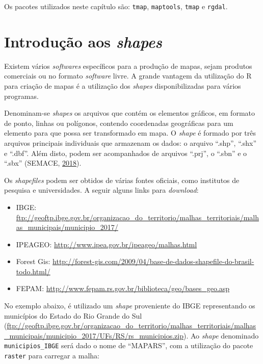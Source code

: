 \documentclass[12pt,brazil,oneside]{book}
\begin{document}
Os pacotes utilizados neste capítulo são: \texttt{tmap}, \texttt{maptools},
\texttt{tmap} e \texttt{rgdal}.

\hypertarget{introducao-aos-shapes}{%
\section{\texorpdfstring{Introdução aos \emph{shapes}}{Introdução aos shapes}}\label{introducao-aos-shapes}}

Existem vários \emph{softwares} específicos para a produção de mapas, sejam produtos comerciais ou no formato \emph{software} livre. A grande vantagem da utilização do R para criação de mapas é a utilização dos \emph{shapes} disponibilizadas para vários programas.

Denominam-se \emph{shapes} os arquivos que contém os elementos gráficos, em formato de ponto, linhas ou polígonos, contendo coordenadas geográficas para um elemento para que possa ser transformado em mapa. O \emph{shape} é formado por três arquivos principais individuais que armazenam os dados: o arquivo ``.shp'', ``.shx'' e ``.dbf''. Além disto, podem ser acompanhados de arquivos ``.prj'', o ``.sbn'' e o ``.sbx'' (SEMACE, \protect\hyperlink{ref-Semace2018}{2018}).

Os \emph{shapefiles} podem ser obtidos de várias fontes oficiais, como institutos de pesquisa e universidades. A seguir alguns links para \emph{download}:

\begin{itemize}
\item
  IBGE: \url{ftp://geoftp.ibge.gov.br/organizacao_do_territorio/malhas_territoriais/malhas_municipais/municipio_2017/}
\item
  IPEAGEO: \url{http://www.ipea.gov.br/ipeageo/malhas.html}
\item
  Forest Gis: \url{http://forest-gis.com/2009/04/base-de-dados-shapefile-do-brasil-todo.html/}
\item
  FEPAM: \url{http://www.fepam.rs.gov.br/biblioteca/geo/bases_geo.asp}
\end{itemize}

No exemplo abaixo, é utilizado um \emph{shape} proveniente do IBGE representando os municípios do Estado do Rio Grande do Sul (\url{ftp://geoftp.ibge.gov.br/organizacao_do_territorio/malhas_territoriais/malhas_municipais/municipio_2017/UFs/RS/rs_municipios.zip}). Ao \emph{shape} denominado \texttt{municipios\_IBGE} será dado o nome de ``MAPARS'', com a utilização do pacote \texttt{raster} para carregar a malha:
\end{document}
